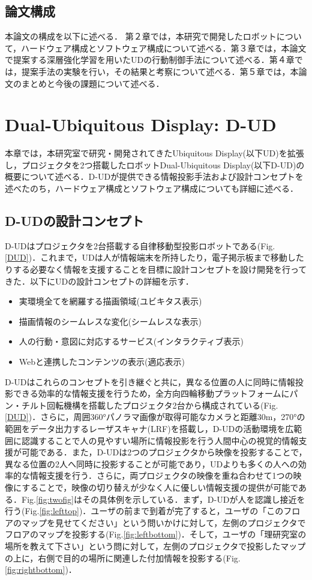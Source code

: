 \documentclass[12pt]{sonota/aislab}
\begin{document}
\section{論文構成}
本論文の構成を以下に述べる．
第２章では，本研究で開発したロボットについて，ハードウェア構成とソフトウェア構成について述べる．第３章では，本論文で提案する深層強化学習を用いたUDの行動制御手法について述べる．第４章では，提案手法の実験を行い，その結果と考察について述べる．第５章では，本論文のまとめと今後の課題について述べる．


\chapter{Dual-Ubiquitous Display: D-UD}\label{chap:d_ud_mechanism}
本章では，本研究室で研究・開発されてきたUbiquitous Display(以下UD)を拡張し，プロジェクタを2つ搭載したロボットDual-Ubiquitous Display(以下D-UD)の概要について述べる．D-UDが提供できる情報投影手法および設計コンセプトを述べたのち，ハードウェア構成とソフトウェア構成についても詳細に述べる．

\section{D-UDの設計コンセプト}
D-UDはプロジェクタを2台搭載する自律移動型投影ロボットである(Fig.\ref{DUD})．これまで，UDは人が情報端末を所持したり，電子掲示板まで移動したりする必要なく情報を支援することを目標に設計コンセプトを設け開発を行ってきた\cite{UD1}．以下にUDの設計コンセプトの詳細を示す．

\begin{itemize}
\item 実環境全てを網羅する描画領域(ユビキタス表示)
\item 描画情報のシームレスな変化(シームレスな表示)
\item 人の行動・意図に対応するサービス(インタラクティブ表示)
\item Webと連携したコンテンツの表示(適応表示)
\end{itemize}

D-UDはこれらのコンセプトを引き継ぐと共に，異なる位置の人に同時に情報投影できる効率的な情報支援を行うため，全方向四輪移動プラットフォームにパン・チルト回転機構を搭載したプロジェクタ2台から構成されている(Fig.\ref{DUD})．さらに，周囲360°パノラマ画像が取得可能なカメラと距離30m，270°の範囲をデータ出力するレーザスキャナ(LRF)を搭載し，D-UDの活動環境を広範囲に認識することで人の見やすい場所に情報投影を行う人間中心の視覚的情報支援が可能である．また，D-UDは2つのプロジェクタから映像を投影することで，異なる位置の2人へ同時に投影することが可能であり，UDよりも多くの人への効率的な情報支援を行う．さらに，両プロジェクタの映像を重ね合わせて1つの映像にすることで，映像の切り替えが少なく人に優しい情報支援の提供が可能である．Fig.\ref{fig:twofig}はその具体例を示している．まず，D-UDが人を認識し接近を行う(Fig.\ref{fig:lefttop})．ユーザの前まで到着が完了すると，ユーザの「このフロアのマップを見せてください」という問いかけに対して，左側のプロジェクタでフロアのマップを投影する(Fig.\ref{fig:leftbottom})．そして，ユーザの「理研究室の場所を教えて下さい」という問に対して，左側のプロジェクタで投影したマップの上に，右側で目的の場所に関連した付加情報を投影する(Fig.\ref{fig:rightbottom})．
\end{document}
